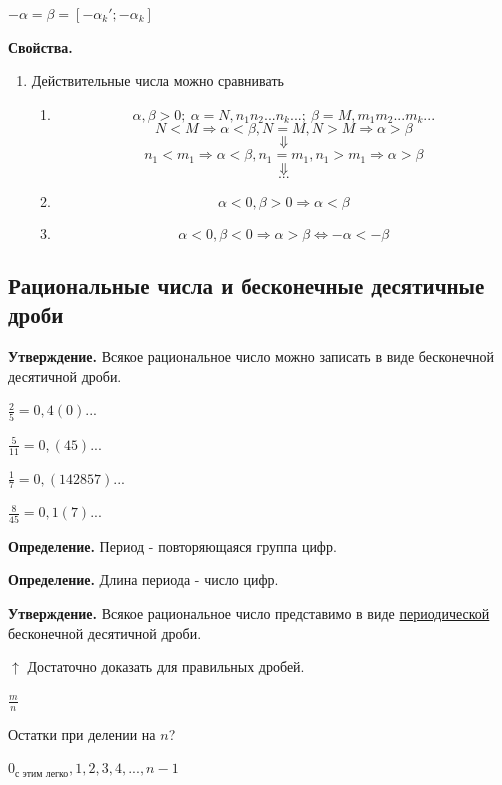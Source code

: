 \documentclass{article}
\begin{document}
        $-\alpha = \beta = [-\alpha_k'; -\alpha_k]$

        \textbf{Свойства.}

        \begin{enumerate}[0.]
            \item Действительные числа можно сравнивать
            \begin{enumerate}[1.]
                \item \[\alpha, \beta > 0;\ \alpha = N,n_1n_2...n_k...;\ \beta = M,m_1m_2...m_k...\]
                \[N < M \Rightarrow \alpha < \beta, N = M, N > M \Rightarrow \alpha > \beta\]
                \[\Downarrow\]
                \[n_1 < m_1 \Rightarrow \alpha < \beta, n_1 = m_1, n_1 > m_1 \Rightarrow \alpha > \beta\]
                \[\Downarrow\]
                \[...\]
                \item \[\alpha < 0, \beta > 0 \Rightarrow \alpha < \beta\]
                \item \[\alpha < 0, \beta < 0 \Rightarrow \alpha > \beta \Leftrightarrow -\alpha < -\beta\]
            \end{enumerate}
        \end{enumerate}

        \subsection{Рациональные числа и бесконечные десятичные дроби}
        \textbf{Утверждение.} Всякое рациональное число можно записать в виде бесконечной десятичной дроби. 

        $\frac{2}{5} = 0,4(0)...$

        $\frac{5}{11} = 0,(45)...$

        $\frac{1}{7} = 0,(142857)...$

        $\frac{8}{45} = 0,1(7)...$

        \textbf{Определение.} Период - повторяющаяся группа цифр.

        \textbf{Определение.} Длина периода - число цифр.

        \textbf{Утверждение.} Всякое рациональное число представимо в виде \underline{периодической} бесконечной десятичной дроби.

        $\uparrow$ Достаточно доказать для правильных дробей.

        $\frac{m}{n}$

        Остатки при делении на $n$?

        $0_{\textrm{с этим легко}}, 1, 2, 3, 4, ..., n - 1$
\end{document}
